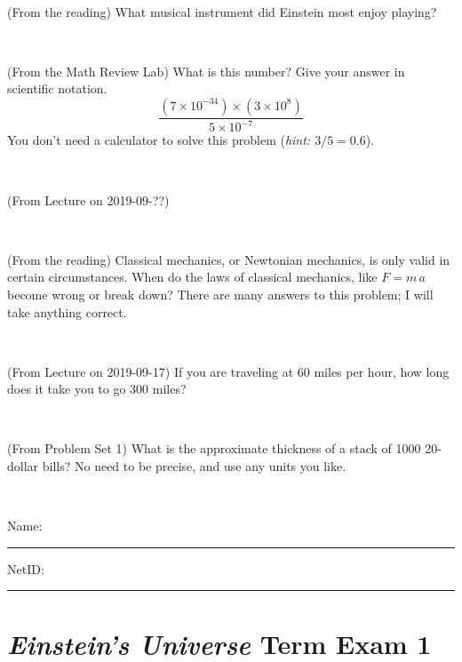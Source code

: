 \documentclass[12pt, letterpaper]{article}
\begin{document}
\vfill ~

\begin{problem} (From the reading)
What musical instrument did Einstein most enjoy playing?
\end{problem}


\vfill ~

\begin{problem} (From the Math Review Lab)
What is this number? Give your answer in scientific notation.
$$
\frac{(7\times10^{-34})\times(3\times10^8)}{5\times10^{-7}}
$$
You don't need a calculator to solve this problem (\textit{hint: $3/5=0.6$}).
\end{problem}


\vfill ~


\clearpage


\begin{problem} (From Lecture on 2019-09-??)
\end{problem}


\vfill ~

\begin{problem} (From the reading)
Classical mechanics, or Newtonian mechanics, is only valid in certain
circumstances. When do the laws of classical mechanics, like $F =
m\,a$ become wrong or break down? There are many answers to this
problem; I will take anything correct.
\end{problem}


\vfill ~

\begin{problem} (From Lecture on 2019-09-17)
If you are traveling at 60 miles per hour, how long does
it take you to go 300 miles?
\end{problem}


\vfill ~

\begin{problem} (From Problem Set 1)
What is the approximate thickness of a stack of 1000 20-dollar bills?
No need to be precise, and use any units you like.
\end{problem}


\vfill ~


\cleardoublepage



\noindent
Name: \rule[-1ex]{0.60\textwidth}{0.1pt}
NetID: \rule[-1ex]{0.20\textwidth}{0.1pt}

\section*{\textsl{Einstein's Universe} Term Exam 1}
\setcounter{problem}{1}
\end{document}
